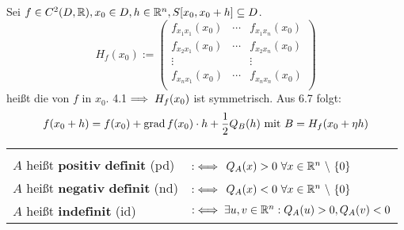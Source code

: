 \documentclass[a4paper,oneside,DIV15,BCOR12mm,chapterprefix=true,headings=onelinechapter]{scrbook}
\begin{document}
\begin{beispiel}
Sei $f\in C^2(D,\mathbb{R}),x_0\in D, h\in \mathbb{R}^n, S[x_0,x_0+h]\subseteq D$.
$$H_f(x_0):=\begin{pmatrix}
f_{x_1x_1}(x_0)&\cdots&f_{x_1x_n}(x_0)\\
f_{x_2x_1}(x_0)&\cdots&f_{x_2x_n}(x_0)\\
\vdots& &\vdots\\
f_{x_nx_1}(x_0)&\cdots&f_{x_nx_n}(x_0)\\
\end{pmatrix}$$
heißt die  von $f$ in $x_0$. 4.1$\implies H_f(x_0)$ ist symmetrisch. Aus 6.7 folgt:
$$f(x_0+h)=f(x_0)+\mathop{\rm grad}\nolimits f(x_0)\cdot h + \frac{1}{2}Q_B(h)\text{ mit }B=H_f(x_0+\eta h)$$
\end{beispiel}
\begin{definition*}
\begin{tabular}{ll}
\\ %
\\
\index{Positivdefinitheit}
\index{Indefinitheit}
\index{Negativdefinitheit}
$A$ heißt $\textbf{positiv definit}$ (pd) & $:\iff$ $Q_A(x)>0\ \forall x\in\MdR^n\ \backslash\ \{0\}$\\
$A$ heißt $\textbf{negativ definit}$ (nd) & $:\iff$ $Q_A(x)<0\ \forall x\in\MdR^n\ \backslash\ \{0\}$\\
$A$ heißt $\textbf{indefinit}$ (id) & $:\iff \exists u,v\in\mathbb{R}^n: Q_A(u)>0, Q_A(v)<0$
\end{tabular}
\end{definition*}
\end{document}
